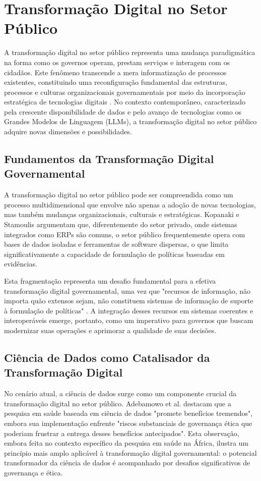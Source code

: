 \section{Transformação Digital no Setor Público}

A transformação digital no setor público representa uma mudança paradigmática na forma como os governos operam, prestam serviços e interagem com os cidadãos. Este fenômeno transcende a mera informatização de processos existentes, constituindo uma reconfiguração fundamental das estruturas, processos e culturas organizacionais governamentais por meio da incorporação estratégica de tecnologias digitais \cite{ref_42}. No contexto contemporâneo, caracterizado pela crescente disponibilidade de dados e pelo avanço de tecnologias como os Grandes Modelos de Linguagem (LLMs), a transformação digital no setor público adquire novas dimensões e possibilidades.

\subsection{Fundamentos da Transformação Digital Governamental}

A transformação digital no setor público pode ser compreendida como um processo multidimensional que envolve não apenas a adoção de novas tecnologias, mas também mudanças organizacionais, culturais e estratégicas. Kopanaki e Stamoulis \cite{ref_131} argumentam que, diferentemente do setor privado, onde sistemas integrados como ERPs são comuns, o setor público frequentemente opera com bases de dados isoladas e ferramentas de software dispersas, o que limita significativamente a capacidade de formulação de políticas baseadas em evidências.

Esta fragmentação representa um desafio fundamental para a efetiva transformação digital governamental, uma vez que "recursos de informação, não importa quão extensos sejam, não constituem sistemas de informação de suporte à formulação de políticas" \cite{ref_131}. A integração desses recursos em sistemas coerentes e interoperáveis emerge, portanto, como um imperativo para governos que buscam modernizar suas operações e aprimorar a qualidade de suas decisões.

\subsection{Ciência de Dados como Catalisador da Transformação Digital}

No cenário atual, a ciência de dados surge como um componente crucial da transformação digital no setor público. Adebamowo et al. \cite{Adebamowo2023} destacam que a pesquisa em saúde baseada em ciência de dados "promete benefícios tremendos", embora sua implementação enfrente "riscos substanciais de governança ética que poderiam frustrar a entrega desses benefícios antecipados". Esta observação, embora feita no contexto específico da pesquisa em saúde na África, ilustra um princípio mais amplo aplicável à transformação digital governamental: o potencial transformador da ciência de dados é acompanhado por desafios significativos de governança e ética.

